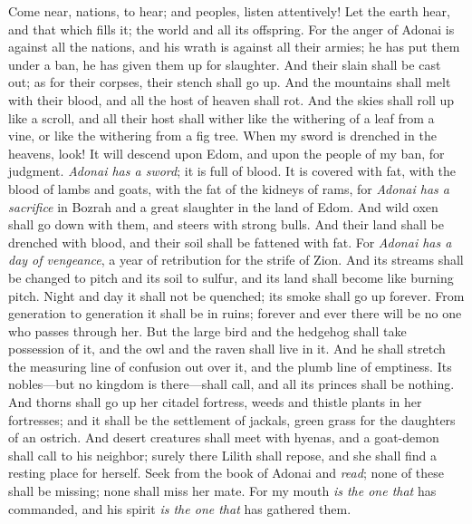 \begin{biblechapter} %
 Come near, nations, to hear; 
and peoples, listen attentively! 
Let the earth hear, and that which fills it; 
the world and all its offspring.
\verse For the anger of Adonai is against all the nations, 
and his wrath is against all their armies; 
he has put them under a ban, 
he has given them up for slaughter.
\verse And their slain shall be cast out; 
as for their corpses, their stench shall go up. 
And the mountains shall melt with their blood,
\verse and all the host of heaven shall rot. 
And the skies shall roll up like a scroll, 
and all their host shall wither 
like the withering of a leaf from a vine, 
or like the withering from a fig tree.
\verse When my sword is drenched in the heavens, look! It will descend upon Edom, 
and upon the people of my ban, for judgment.
\verse \textit{Adonai has a sword};
\verse it is full of blood. 
It is covered with fat, 
with the blood of lambs and goats, 
with the fat of the kidneys of rams, 
for \textit{Adonai has a sacrifice} in Bozrah 
and a great slaughter in the land of Edom.
\verse And wild oxen shall go down with them, 
and steers with strong bulls. 
And their land shall be drenched with blood, 
and their soil shall be fattened with fat.
\verse For \textit{Adonai has a day of vengeance}, 
a year of retribution for the strife of Zion.
\verse And its streams shall be changed to pitch and its soil to sulfur, 
and its land shall become like burning pitch.
\verse Night and day it shall not be quenched; 
its smoke shall go up forever. 
From generation to generation it shall be in ruins; 
forever and ever there will be no one who passes through her.
\verse But the large bird and the hedgehog shall take possession of it, 
and the owl and the raven shall live in it. 
And he shall stretch the measuring line of confusion out over it, 
and the plumb line of emptiness.
\verse Its nobles—but no kingdom is there—shall call, 
and all its princes shall be nothing.
\verse And thorns shall go up her citadel fortress, 
weeds and thistle plants in her fortresses; 
and it shall be the settlement of jackals, 
green grass for the daughters of an ostrich.
\verse And desert creatures shall meet with hyenas, 
and a goat-demon shall call to his neighbor; 
surely there Lilith shall repose, 
and she shall find a resting place for herself.
\verse Seek from the book of Adonai and \textit{read};
\verse none of these shall be missing; 
none shall miss her mate. 
For my mouth \textit{is the one that} has commanded, 
and his spirit \textit{is the one that} has gathered them.
\end{biblechapter}

